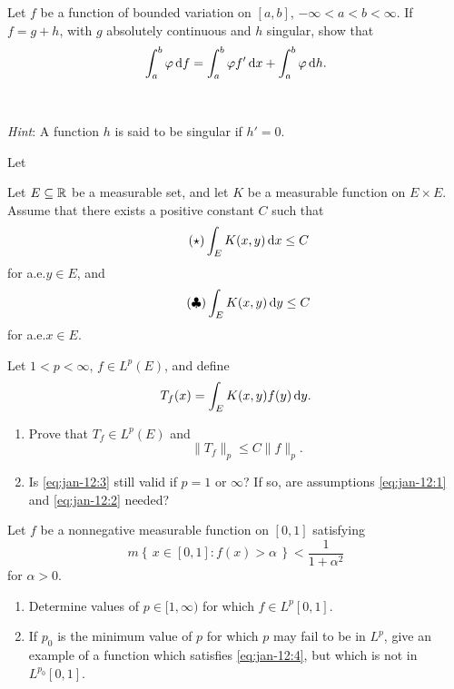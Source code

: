 \begin{problem}
  Let \(f\) be a function of bounded variation on \([a,b]\),
  \(-\infty<a<b<\infty\). If \(f=g+h\), with \(g\) absolutely continuous
  and \(h\) singular, show that
  \[
    \int_a^b\varphi\mathop{}\!\mathrm{d} f=\int_a^b\varphi f'\mathop{}\!\mathrm{d} x+\int_a^b\varphi\mathop{}\!\mathrm{d}
    h.
  \]
  \\\\
  \emph{Hint}: A function \(h\) is said to be singular if \(h'=0\).
\end{problem}
\begin{solution}
  Let
\end{solution}

\begin{problem}
  Let \(E\subseteq\mathbb{R}\) be a measurable set, and let \(K\) be a measurable
  function on \(E\times E\). Assume that there exists a positive constant
  \(C\) such that
  \[
    \label{eq:jan-12:1}
    \tag{\(\bigstar\)}
    \int_E K(x,y)\diff x\leq C
  \]
  for a.e.\@ \(y\in E\), and
  \[
    \label{eq:jan-12:2}
    \tag{\(\clubsuit\)}
    \int_E K(x,y)\mathop{}\!\mathrm{d} y\leq C
  \]
  for a.e.\@ \(x\in E\).

  Let \(1<p<\infty\), \(f\in L^p(E)\), and define
  \[
    T_f(x)=\int_E K(x,y)f(y)\mathop{}\!\mathrm{d} y.
  \]
  \begin{enumerate}[label=(\alph*)]
  \item Prove that \(T_f\in L^p(E)\) and
    \[
      \label{eq:jan-12:3}
      \tag{\(\spadesuit\)}
      \|T_f\|_p\leq C\|f\|_p.
    \]
  \item Is \eqref{eq:jan-12:3} still valid if \(p=1\) or \(\infty\)? If so,
    are assumptions \eqref{eq:jan-12:1} and \eqref{eq:jan-12:2} needed?
  \end{enumerate}
\end{problem}
\begin{solution}
\end{solution}

\begin{problem}
  Let \(f\) be a nonnegative measurable function on \([0,1]\) satisfying
  \[
    \label{eq:jan-12:4}%
    \tag{\(\blacklozenge\)}%
    m\left\{\,x\in[0,1]:f(x)>\alpha\,\right\}<\frac{1}{1+\alpha^2}
  \]
  for \(\alpha>0\).
  \begin{enumerate}[label=(\alph*)]
  \item Determine values of \(p\in[1,\infty)\) for which \(f\in L^p[0,1]\).
  \item If \(p_0\) is the minimum value of \(p\) for which \(p\) may fail
    to be in \(L^p\), give an example of a function which satisfies
    \eqref{eq:jan-12:4}, but which is not in \(L^{p_0}[0,1]\).
\end{enumerate}
\end{problem}
\begin{solution}
\end{solution}

